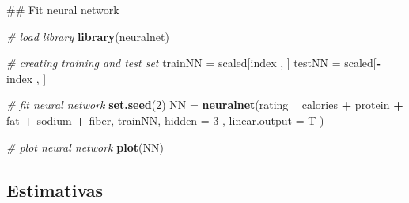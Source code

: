 \documentclass[a4paper, 12pt]{article}
\newenvironment{Shaded}{\begin{snugshade}}{\end{snugshade}}
\newcommand{\KeywordTok}[1]{\textcolor[rgb]{0.13,0.29,0.53}{\textbf{#1}}}
\newcommand{\DataTypeTok}[1]{\textcolor[rgb]{0.13,0.29,0.53}{#1}}
\newcommand{\DecValTok}[1]{\textcolor[rgb]{0.00,0.00,0.81}{#1}}
\newcommand{\StringTok}[1]{\textcolor[rgb]{0.31,0.60,0.02}{#1}}
\newcommand{\CommentTok}[1]{\textcolor[rgb]{0.56,0.35,0.01}{\textit{#1}}}
\newcommand{\OperatorTok}[1]{\textcolor[rgb]{0.81,0.36,0.00}{\textbf{#1}}}
\newcommand{\NormalTok}[1]{#1}
\begin{document}
\begin{Shaded}
\begin{Highlighting}[]
\NormalTok{## Fit neural network }

\CommentTok{# load library}
\KeywordTok{library}\NormalTok{(neuralnet)}

\CommentTok{# creating training and test set}
\NormalTok{trainNN =}\StringTok{ }\NormalTok{scaled[index , ]}
\NormalTok{testNN =}\StringTok{ }\NormalTok{scaled[}\OperatorTok{-}\NormalTok{index , ]}

\CommentTok{# fit neural network}
\KeywordTok{set.seed}\NormalTok{(}\DecValTok{2}\NormalTok{)}
\NormalTok{NN =}\StringTok{ }\KeywordTok{neuralnet}\NormalTok{(rating }\OperatorTok{~}\StringTok{ }\NormalTok{calories }\OperatorTok{+}\StringTok{ }\NormalTok{protein }\OperatorTok{+}\StringTok{ }\NormalTok{fat }\OperatorTok{+}\StringTok{ }\NormalTok{sodium }\OperatorTok{+}\StringTok{ }\NormalTok{fiber, trainNN, }
               \DataTypeTok{hidden =} \DecValTok{3}\NormalTok{ , }\DataTypeTok{linear.output =}\NormalTok{ T )}

\CommentTok{# plot neural network}
\KeywordTok{plot}\NormalTok{(NN)}
\end{Highlighting}
\end{Shaded}

\subsection{Estimativas}\label{estimativas}

\begin{Shaded}
\end{Shaded}
\end{document}
